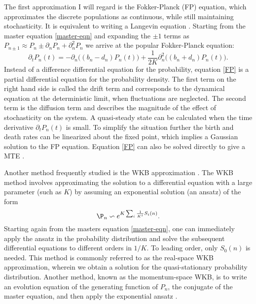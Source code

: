 The first approximation I will regard is the Fokker-Planck (FP) equation, which approximates the discrete populations as continuous, while still maintaining stochasticity. It is equivalent to writing a Langevin equation \cite{Gardiner2004?}. %
Starting from the master equation \ref{master-eqn} and expanding the $\pm 1$ terms as $P_{n\pm 1} \approx P_n \pm \partial_n P_n + \partial^2_n P_n$ we arrive at the popular Fokker-Planck equation:
\begin{equation}
\partial_t P_n(t) = - \partial_n\big( (b_n - d_n) P_n(t) \big) + \frac{1}{2 K} \partial_n^2 \Big( (b_n + d_n) P_n(t) \Big). \label{FP}
\end{equation}
Instead of a difference differential equation for the probability, equation \ref{FP} is a partial differential equation for the probability density. %
The first term on the right hand side is called the drift term and corresponds to the dynamical equation at the deterministic limit, when fluctuations are neglected. 
The second term is the diffusion term and describes the magnitude of the effect of stochasticity on the system. 
A quasi-steady state can be calculated when the time derivative $\partial_t P_n(t)$ is small. 
To simplify the situation further the birth and death rates can be linearized about the fixed point, which implies a Gaussian solution to the FP equation. 
Equation \ref{FP} can also be solved directly to give a MTE \cite{Gardiner2004}. 

Another method frequently studied is the WKB approximation \cite{}.
The WKB method involves approximating the solution to a differential equation with a large parameter (such as $K$) by assuming an exponential solution (an ansatz) of the form
\begin{equation}
\P_n \backsim e^{K\sum_i \frac{1}{K^i}S_i(n)}.
\label{ansatz}
\end{equation}
Starting again from the masters equation \ref{master-eqn}, one can immediately apply the ansatz in the probability distribution and solve the subsequent differential equations to different orders in $1/K$\cite{Assaf2016,etc}.%
To leading order, only $S_0(n)$ is needed. 
This method is commonly referred to as the real-space WKB approximation, wherein we obtain a solution for the quasi-stationary probability distribution.
Another method, known as the momentum-space WKB, is to write an evolution equation of the generating function of $P_n$, the conjugate of the master equation, and then apply the exponential ansatz \cite{Generating function stuff}.

